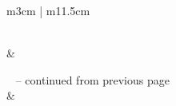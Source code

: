 
\begin{longtable}{ m{3cm} | m{11.5cm}}
\caption{Modules and their tasks} 
\label{tab:derived_tasks} \\

 & 
 \\

\toprule
\endfirsthead

%
{\tablename\ \thetable{} -- continued from previous page} \\ 
 &
\\
\toprule
\endhead

\midrule
{} \\
\endfoot


\end{longtable}
